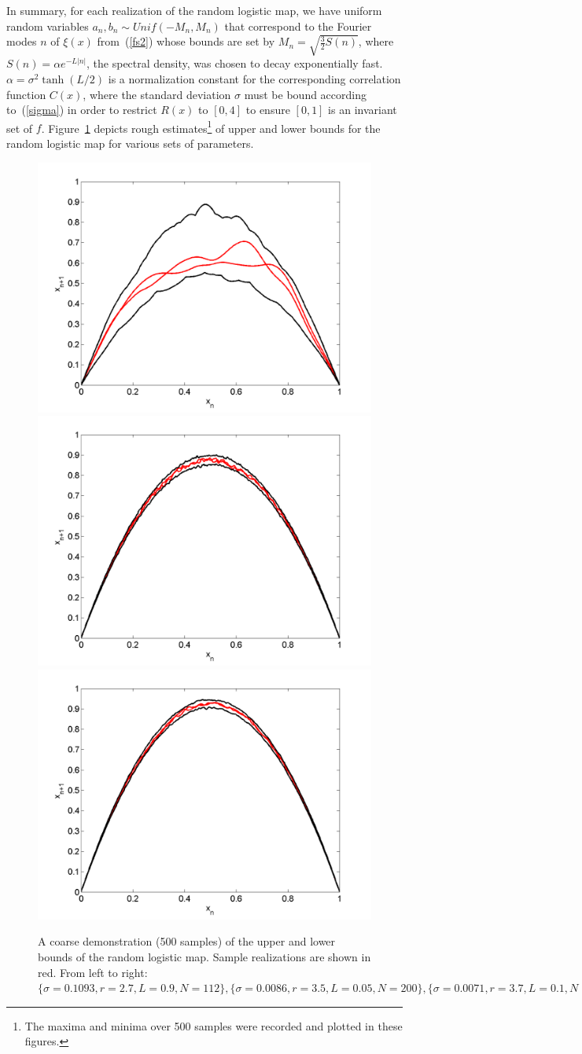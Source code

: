 In summary, for each realization of the random logistic map,
we have uniform random variables $a_n,b_n \sim Unif(-M_n,M_n)$ that correspond to the
Fourier modes $n$ of $\xi(x)$ from~(\ref{fs2}) whose bounds are set by
$M_n= \sqrt{\frac{3}{2}S(n)}$, where $S(n)=\alpha e^{-L|n|}$, the
spectral density, was chosen to decay exponentially fast. $\alpha = \sigma^2 \tanh(L/2)$ is a normalization constant for the corresponding
correlation function $C(x)$, where the standard deviation $\sigma$
must be bound according to~(\ref{sigma}) in order to restrict $R(x)$
to $[0,4]$ to ensure $[0,1]$ is an invariant set of
$f$. Figure~\ref{fig:envelope} depicts rough estimates\footnote{The
  maxima and minima over 500 samples were recorded and plotted in
  these figures.} of upper and lower bounds for the random logistic
map for various sets of parameters. 
\begin{figure}[htp]
\caption[Upper and lower bounds on the random logistic map]{A coarse
  demonstration (500 samples) of the upper and lower bounds of the random logistic
  map. Sample realizations are shown in red. From left to right:
  $\{\sigma=0.1093,r=2.7,L=0.9,N=112\}, \{\sigma=0.0086,r=3.5,L=0.05,N=200\},\{\sigma=0.0071,r=3.7,L=0.1,N=100\}$
  }\label{fig:envelope}
\centering
\includegraphics[width=.3\textwidth]{figs/envelope_500_r27_L09.png}\hfill
\includegraphics[width=.3\textwidth]{figs/envelope_500_r35_L005.png}\hfill
\includegraphics[width=.3\textwidth]{figs/envelope_500_r37_L01.png}
\end{figure}

